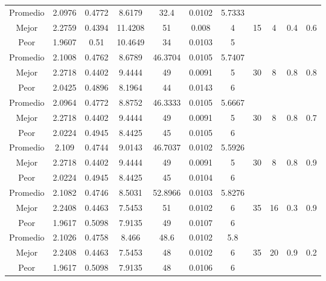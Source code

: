 \begin{table}[h!]
\begin{center}
\begin{tabular}{|c|c|c|c|c|c|c|c|c|c|c|}
        \hline
        \hline
            Promedio  & 2.0976 & 0.4772 & 8.6179 & 32.4 & 0.0102 & 5.7333 &  &  &  & \\
            \cline{1-7}
            Mejor & 2.2759 & 0.4394  & 11.4208 & 51 & 0.008 & 4 & 15 & 4 & 0.4 & 0.6\\
            \cline{1-7}
            Peor & 1.9607 & 0.51  & 10.4649 & 34 & 0.0103 & 5 &  &  &  & \\
        \hline
        \hline
            Promedio  & 2.1008 & 0.4762 & 8.6789 & 46.3704 & 0.0105 & 5.7407 &  &  &  & \\
            \cline{1-7}
            Mejor & 2.2718 & 0.4402  & 9.4444 & 49 & 0.0091 & 5 & 30 & 8 & 0.8 & 0.8\\
            \cline{1-7}
            Peor & 2.0425 & 0.4896  & 8.1964 & 44 & 0.0143 & 6 &  &  &  & \\
        \hline
        \hline
            Promedio  & 2.0964 & 0.4772 & 8.8752 & 46.3333 & 0.0105 & 5.6667 &  &  &  & \\
            \cline{1-7}
            Mejor & 2.2718 & 0.4402  & 9.4444 & 49 & 0.0091 & 5 & 30 & 8 & 0.8 & 0.7\\
            \cline{1-7}
            Peor & 2.0224 & 0.4945  & 8.4425 & 45 & 0.0105 & 6 &  &  &  & \\
        \hline
        \hline
            Promedio  & 2.109 & 0.4744 & 9.0143 & 46.7037 & 0.0102 & 5.5926 &  &  &  & \\
            \cline{1-7}
            Mejor & 2.2718 & 0.4402  & 9.4444 & 49 & 0.0091 & 5 & 30 & 8 & 0.8 & 0.9\\
            \cline{1-7}
            Peor & 2.0224 & 0.4945  & 8.4425 & 45 & 0.0104 & 6 &  &  &  & \\
        \hline
        \hline
            Promedio  & 2.1082 & 0.4746 & 8.5031 & 52.8966 & 0.0103 & 5.8276 &  &  &  & \\
            \cline{1-7}
            Mejor & 2.2408 & 0.4463  & 7.5453 & 51 & 0.0102 & 6 & 35 & 16 & 0.3 & 0.9\\
            \cline{1-7}
            Peor & 1.9617 & 0.5098  & 7.9135 & 49 & 0.0107 & 6 &  &  &  & \\
        \hline
        \hline
            Promedio  & 2.1026 & 0.4758 & 8.466 & 48.6 & 0.0102 & 5.8 &  &  &  & \\
            \cline{1-7}
            Mejor & 2.2408 & 0.4463  & 7.5453 & 48 & 0.0102 & 6 & 35 & 20 & 0.9 & 0.2\\
            \cline{1-7}
            Peor & 1.9617 & 0.5098  & 7.9135 & 48 & 0.0106 & 6 &  &  &  & \\

\end{tabular}
\end{center}
\end{table}
